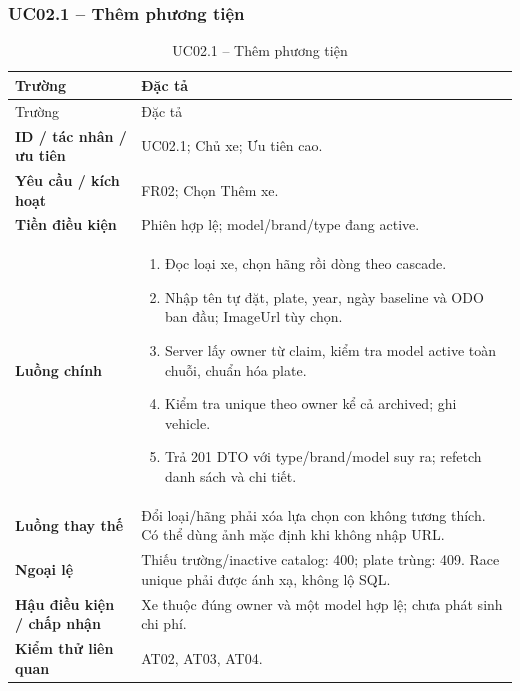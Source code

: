 \subsubsection{UC02.1 -- Thêm phương tiện}\label{uc:UC02.1}
\begin{smalltable}\begin{longtable}{L{3.2cm}L{11.8cm}}
\caption{UC02.1 -- Thêm phương tiện}\label{tab:UC02.1}\\
\toprule Trường & Đặc tả\\\midrule\endfirsthead
\toprule Trường & Đặc tả\\\midrule\endhead
\textbf{ID / tác nhân / ưu tiên} & UC02.1; Chủ xe; Ưu tiên cao.\\
\textbf{Yêu cầu / kích hoạt} & FR02; Chọn Thêm xe.\\
\textbf{Tiền điều kiện} & Phiên hợp lệ; model/brand/type đang active.\\
\textbf{Luồng chính} & \begin{enumerate}[leftmargin=*,nosep]
\item Đọc loại xe, chọn hãng rồi dòng theo cascade.
\item Nhập tên tự đặt, plate, year, ngày baseline và ODO ban đầu; ImageUrl tùy chọn.
\item Server lấy owner từ claim, kiểm tra model active toàn chuỗi, chuẩn hóa plate.
\item Kiểm tra unique theo owner kể cả archived; ghi vehicle.
\item Trả 201 DTO với type/brand/model suy ra; refetch danh sách và chi tiết.
\end{enumerate}\\
\textbf{Luồng thay thế} & Đổi loại/hãng phải xóa lựa chọn con không tương thích. Có thể dùng ảnh mặc định khi không nhập URL.\\
\textbf{Ngoại lệ} & Thiếu trường/inactive catalog: 400; plate trùng: 409. Race unique phải được ánh xạ, không lộ SQL.\\
\textbf{Hậu điều kiện / chấp nhận} & Xe thuộc đúng owner và một model hợp lệ; chưa phát sinh chi phí.\\
\textbf{Kiểm thử liên quan} & AT02, AT03, AT04.\\
\bottomrule\end{longtable}\end{smalltable}
